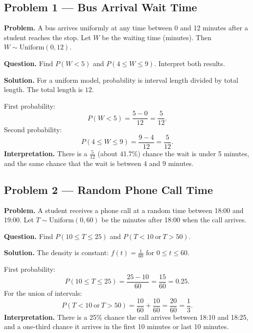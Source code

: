 	\begin{ExamProblems}
		
		\hypertarget{c2-ex1}{}
		\item
		\subsection*{Problem 1 — Bus Arrival Wait Time}
		
		\textbf{Problem.}
		A bus arrives uniformly at any time between 0 and 12 minutes after a student reaches the stop.
		Let \(W\) be the waiting time (minutes). Then \(W\sim\text{Uniform}(0,12)\).
		
		\textbf{Question.} Find \(P(W<5)\) and \(P(4\le W\le 9)\). Interpret both results.
		
		\textbf{Solution.}
		For a uniform model, probability is interval length divided by total length.
		The total length is \(12\).
		
		First probability:
		\[
		P(W<5)=\frac{5-0}{12} = \frac{5}{12}.
		\]
		Second probability:
		\[
		P(4\le W\le 9)=\frac{9-4}{12}=\frac{5}{12}.
		\]
		\textbf{Interpretation.} There is a \(\frac{5}{12}\) (about 41.7\%) chance the wait is under 5 minutes,
		and the same chance that the wait is between 4 and 9 minutes.
		
		
		\hypertarget{c2-ex2}{}
		\item
		\subsection*{Problem 2 — Random Phone Call Time}
		
		\textbf{Problem.}
		A student receives a phone call at a random time between 18:00 and 19:00.
		Let \(T\sim\text{Uniform}(0,60)\) be the minutes after 18:00 when the call arrives.
		
		\textbf{Question.} Find \(P(10\le T\le 25)\) and \(P(T<10\ \text{or}\ T>50)\).
		
		\textbf{Solution.}
		The density is constant: \(f(t)=\frac{1}{60}\) for \(0\le t\le 60\).
		
		First probability:
		\[
		P(10\le T\le 25)=\frac{25-10}{60}=\frac{15}{60}=0.25.
		\]
		For the union of intervals:
		\[
		P(T<10\ \text{or}\ T>50)=\frac{10}{60}+\frac{10}{60}=\frac{20}{60}=\frac{1}{3}.
		\]
		\textbf{Interpretation.} There is a 25\% chance the call arrives between 18:10 and 18:25,
		and a one-third chance it arrives in the first 10 minutes or last 10 minutes.
		

\end{ExamProblems}
